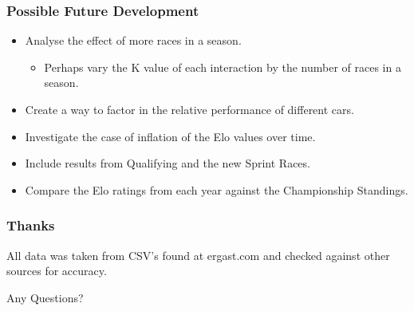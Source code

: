 \documentclass{beamer}
\begin{document}
\begin{frame}
    \frametitle{Possible Future Development}
    \begin{itemize}
        \item Analyse the effect of more races in a season.
        \begin{itemize}
            \item Perhaps vary the K value of each interaction by the number of races in a season.
        \end{itemize}
        \item Create a way to factor in the relative performance of different cars.
        \item Investigate the case of inflation of the Elo values over time.
        \item Include results from Qualifying and the new Sprint Races.
        \item Compare the Elo ratings from each year against the Championship Standings.
    \end{itemize}
\end{frame}


\begin{frame}
    \frametitle{Thanks}
    \begin{center}
        All data was taken from CSV's found at ergast.com and checked against other sources for accuracy.
    
        \LARGE{Any Questions?}
    \end{center}
\end{frame}
\end{document}
